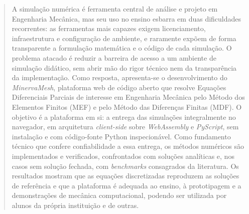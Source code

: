 \begin{abstract}

A simulação numérica é ferramenta central de análise e projeto em Engenharia Mecânica, mas seu uso no ensino esbarra em duas dificuldades recorrentes: as ferramentas mais capazes exigem licenciamento, infraestrutura e configuração de ambiente, e raramente expõem de forma transparente a formulação matemática e o código de cada simulação. O problema atacado é reduzir a barreira de acesso a um ambiente de simulação didático, sem abrir mão do rigor técnico nem da transparência da implementação. Como resposta, apresenta-se o desenvolvimento do \textit{MinervaMesh}, plataforma web de código aberto que resolve Equações Diferenciais Parciais de interesse em Engenharia Mecânica pelo Método dos Elementos Finitos (MEF) e pelo Método das Diferenças Finitas (MDF). O objetivo é a plataforma em si: a entrega das simulações integralmente no navegador, em arquitetura \textit{client-side} sobre \textit{WebAssembly} e \textit{PyScript}, sem instalação e com código-fonte Python inspecionável. Como fundamento técnico que confere confiabilidade a essa entrega, os métodos numéricos são implementados e verificados, confrontados com soluções analíticas e, nos casos sem solução fechada, com \textit{benchmarks} consagrados da literatura. Os resultados mostram que as equações discretizadas reproduzem as soluções de referência e que a plataforma é adequada ao ensino, à prototipagem e a demonstrações de mecânica computacional, podendo ser utilizada por alunos da própria instituição e de outras.

\end{abstract}
